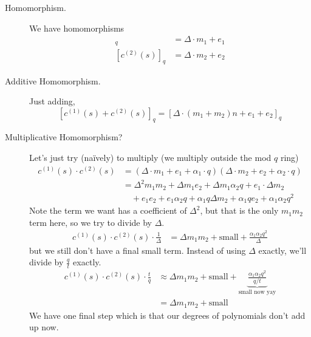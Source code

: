 \begin{description}
    \item[Homomorphism.] We have homomorphisms
        \begin{align*}
            [c^{(1)}(s)]_q & = \Delta\cdot m_1 + e_1 \\
            [c^{(2)}(s)]_q & = \Delta\cdot m_2 + e_2
        \end{align*}
    \item[Additive Homomorphism.] Just adding,
        \[[c^{(1)}(s) + c^{(2)}(s)]_q = [\Delta\cdot (m_1 + m_2)n + e_1 + e_2]_q\]
    \item[Multiplicative Homomorphism?] Let's just try (na\"ively) to multiply (we multiply outside the mod $q$ ring)
        \begin{align*}
            c^{(1)}(s) \cdot c^{(2)}(s)
             & = (\Delta\cdot m_1 + e_1 + \alpha_1\cdot q)(\Delta\cdot m_2 + e_2 + \alpha_2\cdot q)     \\
             & = \Delta^2 m_1m_2 + \Delta m_1e_2 + \Delta m_1\alpha_2q + e_1\cdot \Delta m_2            \\
             & \quad + e_1e_2 + e_1\alpha_2q + \alpha_1q\Delta m_2 + \alpha_1qe_2 + \alpha_1\alpha_2q^2
        \end{align*}
        Note the term we want has a coefficient of $\Delta^2$, but that is the only $m_1m_2$ term here, so we try to divide by $\Delta$.
        \begin{align*}
            c^{(1)}(s) \cdot c^{(2)}(s)\cdot \frac{1}{\Delta}
             & = \Delta m_1m_2 + \text{small} + \frac{\alpha_1\alpha_2q^2}{\Delta}
        \end{align*}
        but we still don't have a final small term. Instead of using $\Delta$ exactly, we'll divide by $\frac{q}{t}$ exactly.
        \begin{align*}
            c^{(1)}(s) \cdot c^{(2)}(s)\cdot \frac{t}{q}
             & \approx \Delta m_1m_2 + \text{small} + \underbrace{\frac{\alpha_1\alpha_2q^2}{q/t}}_{\text{small now yay}} \\
             & = \Delta m_1m_2 + \text{small}
        \end{align*}
        We have one final step which is that our degrees of polynomials don't add up now.
\end{description}
